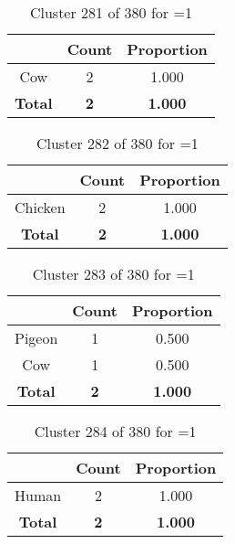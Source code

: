 \begin{table}[ht!]
\centering
\begin{tabular}{|c|c|c|}
\hline
\bf \Spec{} &\bf Count &\bf Proportion\\ \hline \hline
Cow & 2 & 1.000\\ \hline
\hline
\bf Total & \bf 2 & \bf 1.000\\ \hline
\end{tabular}
\label{tab:cluster:281:1}
\caption{Cluster 281 of 380 for \minneigh{}=1}
\end{table}

\begin{table}[ht!]
\centering
\begin{tabular}{|c|c|c|}
\hline
\bf \Spec{} &\bf Count &\bf Proportion\\ \hline \hline
Chicken & 2 & 1.000\\ \hline
\hline
\bf Total & \bf 2 & \bf 1.000\\ \hline
\end{tabular}
\label{tab:cluster:282:1}
\caption{Cluster 282 of 380 for \minneigh{}=1}
\end{table}

\begin{table}[ht!]
\centering
\begin{tabular}{|c|c|c|}
\hline
\bf \Spec{} &\bf Count &\bf Proportion\\ \hline \hline
Pigeon & 1 & 0.500\\ \hline
Cow & 1 & 0.500\\ \hline
\hline
\bf Total & \bf 2 & \bf 1.000\\ \hline
\end{tabular}
\label{tab:cluster:283:1}
\caption{Cluster 283 of 380 for \minneigh{}=1}
\end{table}

\begin{table}[ht!]
\centering
\begin{tabular}{|c|c|c|}
\hline
\bf \Spec{} &\bf Count &\bf Proportion\\ \hline \hline
Human & 2 & 1.000\\ \hline
\hline
\bf Total & \bf 2 & \bf 1.000\\ \hline
\end{tabular}
\label{tab:cluster:284:1}
\caption{Cluster 284 of 380 for \minneigh{}=1}
\end{table}

